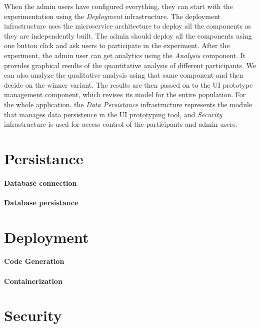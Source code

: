 When the admin users have configured everything, they can start with the experimentation using the \textit{Deployment} infrastructure. 
The deployment infrastructure uses the microservice architecture to deploy all the components as they are independently built. 
The admin should deploy all the components using one button click and ask users to participate in the experiment. 
After the experiment, the admin user can get analytics using the \textit{Analysis} component. 
It provides graphical results of the quantitative analysis of different participants. 
We can also analyze the qualitative analysis using that same component and then decide on the winner variant. 
The results are then passed on to the UI prototype management component, which revises its model for the entire population.  
For the whole application, the \textit{Data Persistance} infrastructure represents the module that manages data persistence in the UI prototyping tool, and \textit{Security} infrastructure is used for access control of the participants and admin users.

\section{Persistance}
\label{sc:section:persistance}

\paragraph{Database connection}
\paragraph{Database persistance}

\section{Deployment}
\label{sc:section:deployment}

\paragraph{Code Generation}
\paragraph{Containerization}

\section{Security}
\label{sc:section:security}

